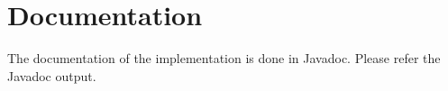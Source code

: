 \chapter{Documentation}

The documentation of the implementation is done in Javadoc. Please refer
the Javadoc output.



